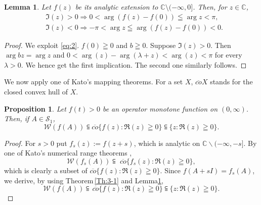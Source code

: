 \documentclass[reqno]{amsart}
\newtheorem{lemma}[theorem]{Lemma}
\newtheorem{proposition}[theorem]{Proposition}
\theoremstyle{definition}
\theoremstyle{remark}
\begin{document}
\begin{lemma}\label{Le:4-1}
Let $f(z)$ be its analytic extension to 
$\mathbb{C}\setminus (-\infty, 0]$.   
Then, for $z \in \mathbb{C}$,  
\begin{align*}
 &\Im (z) > 0 \Longrightarrow  0< \arg (f(z)-f(0)) \leqq \arg z < \pi, \\
 &\Im (z) < 0 \Longrightarrow  -\pi < \arg z \leqq \arg (f(z) - f(0)) < 0.
\end{align*}
\end{lemma}
 \begin{proof} We exploit \eqref{eq:2}.
$f(0)\geqq 0$ and $b\geqq 0$.  Suppose $\Im (z) >0$. Then  $\arg b z = \arg z$ and   
 $ 0< \arg(z) -\arg(\lambda + z) < \arg (z) <\pi$ for every $\lambda >0$.  
We hence get the first implication. The second one similarly follows. 
\end{proof}
We now apply one of Kato's mapping theorems.  For a set $X$, $\overline{co}X$ stands for 
the closed convex hull of $X$. 
\begin{proposition}\label{Prop:4-2} 
Let $f(t)>0$ be an operator monotone function on 
$(0, \infty)$. Then, if $A\in \mathcal{S}_{1}$, 
$$\mathcal{W}(f(A)) \subseteqq  \overline{co}\{f(z):  \Re(z) \geqq 0\} \subseteqq \{z: \Re(z) \geqq 0\}.$$
\end{proposition}
\begin{proof} For $s >0$ put 
$f_{s}(z) \!:= f(z + s)$, which is analytic on $\mathbb{C} \smallsetminus (-\infty, -s]$.
 By one of Kato's numerical range theorems \cite{Kato}, 
 $$\mathcal{W}(f_{s} (A)) \subseteqq  \,\, \overline{co}\{f_{s} (z): \Re(z)\geqq 0 \},$$
 which is clearly a subset of  $\overline{co}\{f(z): \Re(z)\geqq 0 \}$. 
Since $f(A+ s I) = f_{s} (A)$, 
we derive, by using Theorem\,\ref{Th:3-1} and 
Lemma\ref{Le:4-1}, 
$$\mathcal{W}(f (A))\subseteqq\, \overline{co}\{f(z): \Re(z)\geqq 0 \} \subseteqq \{z: \Re(z) \geqq 0\}.$$
\end{proof} 
\end{document}
